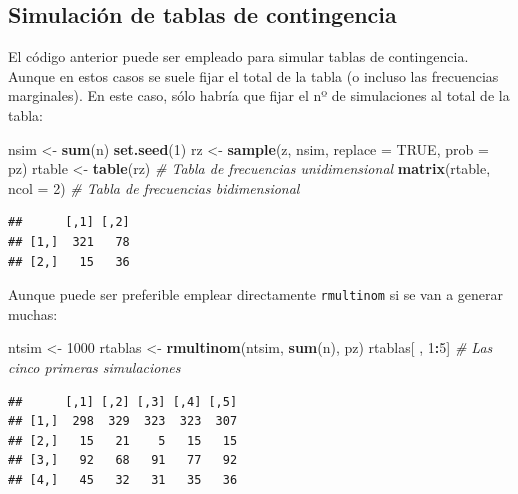 \documentclass[]{book}
\newenvironment{Shaded}{\begin{snugshade}}{\end{snugshade}}
\newcommand{\KeywordTok}[1]{\textcolor[rgb]{0.13,0.29,0.53}{\textbf{#1}}}
\newcommand{\DataTypeTok}[1]{\textcolor[rgb]{0.13,0.29,0.53}{#1}}
\newcommand{\DecValTok}[1]{\textcolor[rgb]{0.00,0.00,0.81}{#1}}
\newcommand{\StringTok}[1]{\textcolor[rgb]{0.31,0.60,0.02}{#1}}
\newcommand{\CommentTok}[1]{\textcolor[rgb]{0.56,0.35,0.01}{\textit{#1}}}
\newcommand{\OtherTok}[1]{\textcolor[rgb]{0.56,0.35,0.01}{#1}}
\newcommand{\OperatorTok}[1]{\textcolor[rgb]{0.81,0.36,0.00}{\textbf{#1}}}
\newcommand{\NormalTok}[1]{#1}
\theoremstyle{definition}
\theoremstyle{definition}
\theoremstyle{definition}
\theoremstyle{remark}
\begin{document}
\subsection{Simulación de tablas de
contingencia}\label{simulacion-de-tablas-de-contingencia}

El código anterior puede ser empleado para simular tablas de
contingencia. Aunque en estos casos se suele fijar el total de la tabla
(o incluso las frecuencias marginales). En este caso, sólo habría que
fijar el nº de simulaciones al total de la tabla:

\begin{Shaded}
\begin{Highlighting}[]
\NormalTok{nsim <-}\StringTok{ }\KeywordTok{sum}\NormalTok{(n)}
\KeywordTok{set.seed}\NormalTok{(}\DecValTok{1}\NormalTok{)}
\NormalTok{rz <-}\StringTok{ }\KeywordTok{sample}\NormalTok{(z, nsim, }\DataTypeTok{replace =} \OtherTok{TRUE}\NormalTok{, }\DataTypeTok{prob =}\NormalTok{ pz)}
\NormalTok{rtable <-}\StringTok{ }\KeywordTok{table}\NormalTok{(rz) }\CommentTok{# Tabla de frecuencias unidimensional}
\KeywordTok{matrix}\NormalTok{(rtable, }\DataTypeTok{ncol =} \DecValTok{2}\NormalTok{) }\CommentTok{# Tabla de frecuencias bidimensional}
\end{Highlighting}
\end{Shaded}

\begin{verbatim}
##      [,1] [,2]
## [1,]  321   78
## [2,]   15   36
\end{verbatim}

Aunque puede ser preferible emplear directamente \texttt{rmultinom} si
se van a generar muchas:

\begin{Shaded}
\begin{Highlighting}[]
\NormalTok{ntsim <-}\StringTok{ }\DecValTok{1000}
\NormalTok{rtablas <-}\StringTok{ }\KeywordTok{rmultinom}\NormalTok{(ntsim, }\KeywordTok{sum}\NormalTok{(n), pz)}
\NormalTok{rtablas[ , }\DecValTok{1}\OperatorTok{:}\DecValTok{5}\NormalTok{] }\CommentTok{# Las cinco primeras simulaciones}
\end{Highlighting}
\end{Shaded}

\begin{verbatim}
##      [,1] [,2] [,3] [,4] [,5]
## [1,]  298  329  323  323  307
## [2,]   15   21    5   15   15
## [3,]   92   68   91   77   92
## [4,]   45   32   31   35   36
\end{verbatim}
\end{document}
